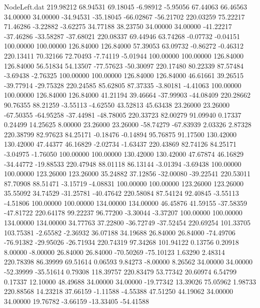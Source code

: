 \begin{filecontents}{NodeLeft.dat}
 219.98212   68.94531   69.18045    -6.98912   -5.95056   67.44063   66.46563   34.00000   34.00000  -34.94531  -35.18045  -66.02867  -56.21702
 220.03259   75.22217   71.46286    -3.22882   -3.62275   34.77188   38.23750   34.00000   34.00000  -41.22217  -37.46286  -33.58287  -37.68021
 220.08337   69.44946   63.74268    -0.07732   -0.04151  100.00000  100.00000  126.84000  126.84000   57.39053   63.09732   -0.86272   -0.46312
 220.13411   70.32166   72.70493    -7.74119   -5.01944  100.00000  100.00000  126.84000  126.84000   56.51834   54.13507  -77.57623  -50.30097
 220.17480   80.22339   87.57484    -3.69438   -2.76325  100.00000  100.00000  126.84000  126.84000   46.61661   39.26515  -39.77914  -29.75328
 220.24585   85.62805   87.37335    -3.80181   -4.41063  100.00000  100.00000  126.84000  126.84000   41.21194   39.46664  -37.99903  -44.08409
 220.28662   90.76355   88.21259    -3.55113   -4.62550   43.52813   45.63438   23.26000   23.26000  -67.50355  -64.95258  -37.44981  -48.78005
 220.33723   82.00279   91.09940     0.17337    0.24499   14.25625    8.00000   23.26000   23.26000  -58.74279  -67.83939    2.03326    2.87328
 220.38799   82.97623   84.25171    -0.18476   -0.14894   95.76875   91.17500  130.42000  130.42000   47.44377   46.16829   -2.02734   -1.63437
 220.43869   82.74126   84.25171    -3.04975   -1.76050  100.00000  100.00000  130.42000  130.42000   47.67874   46.16829  -34.44772  -19.88533
 220.47948   88.01118   86.13144    -3.01394   -3.69438  100.00000  100.00000  123.26000  123.26000   35.24882   37.12856  -32.00080  -39.22541
 220.53011   87.70908   88.51471    -3.15719   -4.08831  100.00000  100.00000  123.26000  123.26000   35.55092   34.74529  -31.25781  -40.47642
 220.58084   87.54124   92.40845    -3.55113   -4.51806  100.00000  100.00000  134.00000  134.00000   46.45876   41.59155  -37.58359  -47.81722
 220.64178   99.22237   96.77200    -3.30044   -3.37207  100.00000  100.00000  134.00000  134.00000   34.77763   37.22800  -36.72749  -37.52454
 220.69254  101.33705  103.75381    -2.65582   -2.36932   36.07188   34.19688   26.84000   26.84000  -74.49706  -76.91382  -29.95026  -26.71934
 220.74319   97.34268  101.94122     0.13756    0.20918    8.00000   -8.00000   26.84000   26.84000  -70.50269  -75.10123    1.63290    2.48314
 220.78398   86.39999   69.51614     0.06593    9.84273   -8.00000    8.26562   34.00000   34.00000  -52.39999  -35.51614    0.79308  118.39757
 220.83479   53.77342   20.60974     6.54799    0.17337   12.10000   48.49688   34.00000   34.00000  -19.77342   13.39026   75.05962    1.98733
 220.88568   14.23218   37.66159    -1.11588   -4.55388   47.51250   44.19062   34.00000   34.00000   19.76782   -3.66159  -13.33405  -54.41588

\end{filecontents}
